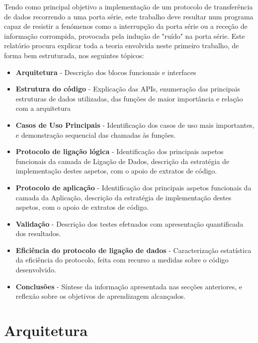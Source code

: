 \documentclass[article, a4paper, 11pt, oneside]{memoir}
\begin{document}
Tendo como principal objetivo a implementação de um protocolo de transferência de dados recorrendo a uma porta série, 
este trabalho deve resultar num programa capaz de resistir a fenómenos como a interrupção da porta série ou a receção de informação corrompida,
provocada pela indução de "ruído" na porta série. Este relatório procura explicar toda a teoria envolvida neste primeiro trabalho, de forma bem estruturada, 
nos seguintes tópicos:
\begin{itemize}
	\item \textbf{Arquitetura} - Descrição dos blocos funcionais e interfaces
	\item \textbf{Estrutura do código} - Explicação das APIs, enumeração das principais estruturas de dados utilizadas, das funções de maior importância e relação com a arquitetura
	\item \textbf{Casos de Uso Principais} - Identificação dos casos de uso mais importantes, e demonstração sequencial das chamadas às funções.
	\item \textbf{Protocolo de ligação lógica} - Identificação dos principais aspetos funcionais da camada de Ligação de Dados, descrição da estratégia de implementação destes aspetos, com o apoio de extratos de código.
	\item \textbf{Protocolo de aplicação} - Identificação dos principais aspetos funcionais da camada da Aplicação, descrição da estratégia de implementação destes aspetos, com o apoio de extratos de código.
	\item \textbf{Validação} - Descrição dos testes efetuados com apresentação quantificada dos resultados.
	\item \textbf{Eficiência do protocolo de ligação de dados} - Caracterização estatística da eficiência do protocolo, feita com recurso a medidas sobre o código desenvolvido.
	\item \textbf{Conclusões} - Síntese da informação apresentada nas secções anteriores, e reflexão sobre os objetivos de aprendizagem alcançados.
\end{itemize}

\chapter[Arquitetura][Arquitetura]{Arquitetura} \label{\thechapter}
\end{document}
